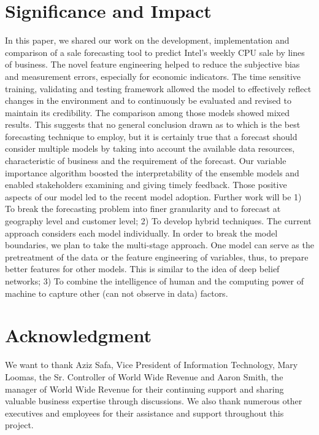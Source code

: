 \documentclass{llncs}
\begin{document}
\section{Significance and Impact}
\label{sec:conclusion}
In this paper, we shared our work on the development, implementation and comparison of a sale forecasting tool to predict Intel's weekly CPU sale by lines of business. The novel feature engineering helped to  reduce the subjective bias and measurement errors, especially for economic indicators. The time sensitive training, validating and testing framework allowed the model to effectively reflect changes in the environment and to continuously be evaluated and revised to maintain its credibility. The comparison among those models showed mixed results. This suggests that no general conclusion drawn as to which is the best forecasting technique to employ, but it is certainly true that a forecast should consider multiple models by taking into account the available data resources, characteristic of business and the requirement of the forecast. Our variable importance algorithm boosted the interpretability of the ensemble models and enabled stakeholders examining and giving timely feedback. Those positive aspects of our model led to the recent model adoption. Further work will be 1) To break the forecasting problem into finer granularity and to forecast at geography level and customer level; 2) To develop hybrid techniques. The current approach considers each model individually. In order to break the model boundaries, we plan to take the multi-stage approach. One model can serve as the pretreatment of the data or the feature engineering of variables, thus, to prepare better features for other models. This is similar to the idea of deep belief networks; 3) To combine the intelligence of human and the computing power of machine to capture other (can not observe in data) factors. 


\section{Acknowledgment}
We want to thank Aziz Safa, Vice President of Information Technology, Mary Loomas, the Sr. Controller of World Wide Revenue and Aaron Smith, the manager of World Wide Revenue for their continuing support and sharing valuable business expertise through discussions. 
We also thank numerous other executives and employees for their assistance and support throughout this project. 



  


 
\end{document}
